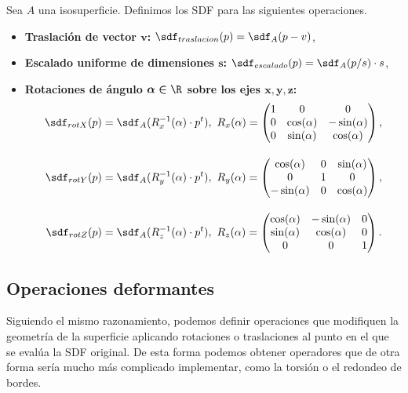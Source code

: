 \begin{definicion}\label{d:afines}
    Sea $A$ una isosuperficie. Definimos los SDF para las siguientes operaciones.
    \begin{itemize}
        \item \textbf{Traslación de vector $\boldsymbol{v}$: } $\sdf_{traslacion}(p) = \sdf_{A}(p - v)$,
        \item \textbf{Escalado uniforme de dimensiones $\boldsymbol{s}$: } $\sdf_{escalado}(p) = \sdf_{A}(p/s)\cdot s$,
        \item \textbf{Rotaciones de ángulo $\boldsymbol{\alpha\in \R}$ sobre los ejes $\boldsymbol{x,y,z}$: }
        \begin{align*}
            \sdf_{rotX}(p) &= \sdf_{A}(R_x^{-1}(\alpha)\cdot p^t),\ R_x(\alpha) = 
            \begin{pmatrix}
                1&0&0\\
                0&\cos(\alpha) & -\sin(\alpha) \\
                0&\sin(\alpha) & \cos(\alpha) 
                \end{pmatrix},\\[10pt] 
            \sdf_{rotY}(p) &= \sdf_{A}(R_y^{-1}(\alpha)\cdot p^t),\ R_y(\alpha) = \begin{pmatrix}
            \cos(\alpha) &0& \sin(\alpha)\\
            0&1&0\\
            -\sin(\alpha) &0& \cos(\alpha) 
            \end{pmatrix},\\[10pt]
            \sdf_{rotZ}(p) &= \sdf_{A}(R_z^{-1}(\alpha)\cdot p^t),\ R_z(\alpha) = \begin{pmatrix}
            \cos(\alpha) & -\sin(\alpha) & 0\\
            \sin(\alpha) & \cos(\alpha) & 0\\
            0&0&1
            \end{pmatrix}.
        \end{align*}
        
    \end{itemize}
\end{definicion}

\subsection{Operaciones deformantes}
Siguiendo el mismo razonamiento, podemos definir operaciones que modifiquen la geometría de la superficie aplicando rotaciones o traslaciones al punto en el que se evalúa la SDF original. De esta forma podemos obtener operadores que de otra forma sería mucho más complicado implementar, como la torsión o el redondeo de bordes.

